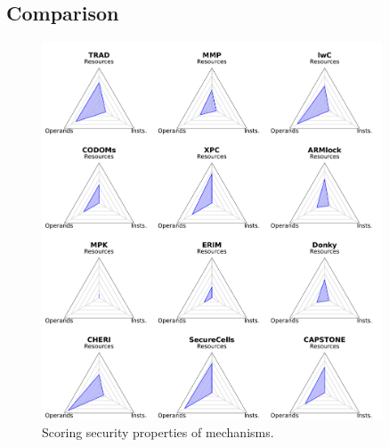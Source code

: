 \subsection{Comparison}
\label{sec:compsok:comparison}
\begin{figure}
  \centering
  \includegraphics[width=0.9\textwidth]{data/compsok/scoring_security.pdf}
  \caption[Scoring security properties of mechanisms.]
          {Scoring security properties of mechanisms.}
  \label{fig:compsok:scoring_sec}
\end{figure}

